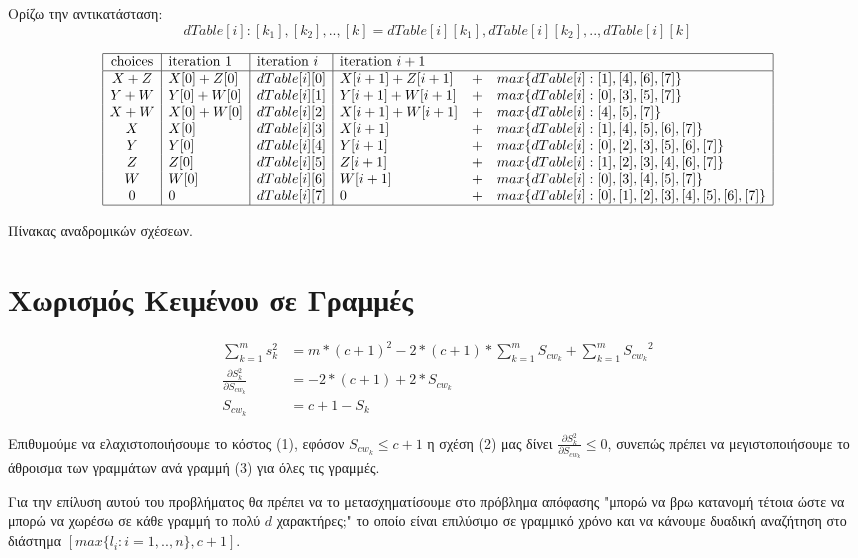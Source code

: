 \documentclass[a4paper,10pt]{article} \usepackage{anysize}
\begin{document}
Ορίζω την αντικατάσταση:
\[
	dTable[i]:[k_1],[k_2],..,[k] = dTable[i][k_1],dTable[i][k_2],..,dTable[i][k]
\]
\begin{table}[h]
\[
\begin{array}{| c | l | l | l  c  l |}
\hline
\text{choices}&\text{iteration }1 & \text{iteration }i&\text{iteration }i+1&&\\
\hline
X+Z&X[0]+Z[0] &dTable[i][0]&X[i+1]+Z[i+1]&+&max\{dTable[i]:[1],[4],[6],[7]\} 
\\
Y+W&Y[0]+W[0] &dTable[i][1]&Y[i+1]+W[i+1]&+&max\{dTable[i]:[0],[3],[5],[7]\}  
\\
X+W&X[0]+W[0] &dTable[i][2]&X[i+1]+W[i+1]&+&max\{dTable[i]:[4],[5],[7]\} 
\\
X&X[0] &dTable[i][3]&X[i+1]&+&max\{dTable[i]:[1],[4],[5],[6],[7]\} 
\\
Y&Y[0] &dTable[i][4]&Y[i+1]&+&max\{dTable[i]:[0],[2],[3],[5],[6],[7]\} 
\\
Z&Z[0] &dTable[i][5]&Z[i+1]&+&max\{dTable[i]:[1],[2],[3],[4],[6],[7]\} 
\\
W&W[0] &dTable[i][6]&W[i+1]&+&max\{dTable[i]:[0],[3],[4],[5],[7]\} 
\\
0&0 &dTable[i][7]&0&+&max\{dTable[i]:[0],[1],[2],[3],[4],[5],[6],[7]\} 
\\
\hline
\end{array}
\]
\caption{Πίνακας αναδρομικών σχέσεων.}
\end{table}



\section{Χωρισμός Κειμένου σε Γραμμές}
\begin{align}
	\sum_{k=1}^{m}{s_{k}^2} & =
	m*(c+1)^2-2*(c+1)*\sum_{k=1}^m{S_{cw_{k}}}+\sum_{k=1}^m{{S_{cw_{k}}}^2}\\
	\frac{\partial{S_k^2}}{\partial{S_{cw_k}}}&=-2*(c+1)+2*S_{cw_k}\\
	S_{cw_k} & =  c+1-S_k 
\end{align}

Επιθυμούμε να ελαχιστοποιήσουμε το κόστος (1), εφόσον $S_{cw_k} \le c+1$ η
σχέση (2) μας δίνει $\frac{\partial{S_k^2}}{\partial{S_{cw_k}}} \le 0 $, συνεπώς 
πρέπει να μεγιστοποιήσουμε το άθροισμα των γραμμάτων ανά γραμμή (3) 
για όλες τις γραμμές.

Για την επίλυση αυτού του προβλήματος θα πρέπει να το μετασχηματίσουμε στο
πρόβλημα απόφασης "μπορώ να βρω κατανομή τέτοια ώστε να μπορώ να χωρέσω σε
κάθε γραμμή το πολύ $d$ χαρακτήρες;" το οποίο είναι επιλύσιμο σε γραμμικό
χρόνο και να κάνουμε δυαδική αναζήτηση στο διάστημα $[max\{l_i:i=1,..,n\},c+1]$.
\end{document}
